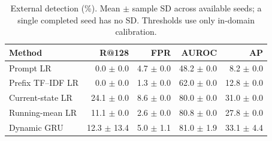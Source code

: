 \begin{table}[t]
\centering\footnotesize
\caption{External detection (\%). Mean $\pm$ sample SD across available seeds; a single completed seed has no SD. Thresholds use only in-domain calibration.}\label{tab:external}
\begin{tabular}{lrrrr}\toprule
Method & R@128 & FPR & AUROC & AP \\
\midrule
Prompt LR & 0.0 $\pm$ 0.0 & 4.7 $\pm$ 0.0 & 48.2 $\pm$ 0.0 & 8.2 $\pm$ 0.0 \\
Prefix TF--IDF LR & 0.0 $\pm$ 0.0 & 1.3 $\pm$ 0.0 & 62.0 $\pm$ 0.0 & 12.8 $\pm$ 0.0 \\
Current-state LR & 24.1 $\pm$ 0.0 & 8.6 $\pm$ 0.0 & 80.0 $\pm$ 0.0 & 31.0 $\pm$ 0.0 \\
Running-mean LR & 11.1 $\pm$ 0.0 & 2.6 $\pm$ 0.0 & 80.8 $\pm$ 0.0 & 27.8 $\pm$ 0.0 \\
Dynamic GRU & 12.3 $\pm$ 13.4 & 5.0 $\pm$ 1.1 & 81.0 $\pm$ 1.9 & 33.1 $\pm$ 4.4 \\
\bottomrule\end{tabular}
\end{table}
